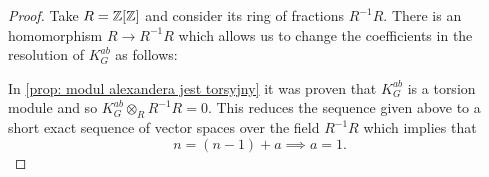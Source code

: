 \begin{proof}
  Take $R=\operatorname{\mathbb{Z}}[\operatorname{\mathbb{Z}}]$ and consider its ring of fractions $R^{-1}R$. There is an homomorphism $R\to R^{-1}R$ which allows us to change the coefficients in the resolution of $K_G^{ab}$ as follows:
  \begin{center}
  \end{center}
  In \cref{prop: modul alexandera jest torsyjny} it was proven that $K_G^{ab}$ is a torsion module and so $K_G^{ab}\otimes_R R^{-1}R=0$. This reduces the sequence given above to a short exact sequence of vector spaces over the field $R^{-1}R$ which implies that 
  $$n=(n-1)+a\implies a=1.$$
\end{proof}


